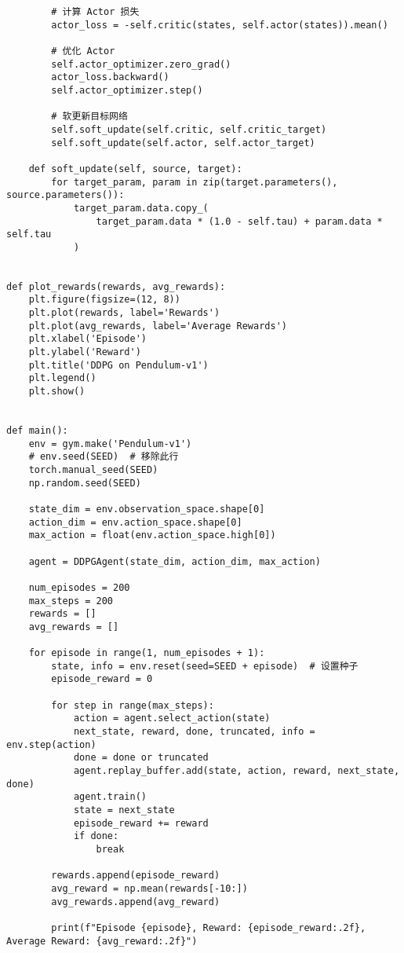 \begin{lstlisting}
        # 计算 Actor 损失
        actor_loss = -self.critic(states, self.actor(states)).mean()

        # 优化 Actor
        self.actor_optimizer.zero_grad()
        actor_loss.backward()
        self.actor_optimizer.step()

        # 软更新目标网络
        self.soft_update(self.critic, self.critic_target)
        self.soft_update(self.actor, self.actor_target)

    def soft_update(self, source, target):
        for target_param, param in zip(target.parameters(), source.parameters()):
            target_param.data.copy_(
                target_param.data * (1.0 - self.tau) + param.data * self.tau
            )


def plot_rewards(rewards, avg_rewards):
    plt.figure(figsize=(12, 8))
    plt.plot(rewards, label='Rewards')
    plt.plot(avg_rewards, label='Average Rewards')
    plt.xlabel('Episode')
    plt.ylabel('Reward')
    plt.title('DDPG on Pendulum-v1')
    plt.legend()
    plt.show()


def main():
    env = gym.make('Pendulum-v1')
    # env.seed(SEED)  # 移除此行
    torch.manual_seed(SEED)
    np.random.seed(SEED)

    state_dim = env.observation_space.shape[0]
    action_dim = env.action_space.shape[0]
    max_action = float(env.action_space.high[0])

    agent = DDPGAgent(state_dim, action_dim, max_action)

    num_episodes = 200
    max_steps = 200
    rewards = []
    avg_rewards = []

    for episode in range(1, num_episodes + 1):
        state, info = env.reset(seed=SEED + episode)  # 设置种子
        episode_reward = 0

        for step in range(max_steps):
            action = agent.select_action(state)
            next_state, reward, done, truncated, info = env.step(action)
            done = done or truncated
            agent.replay_buffer.add(state, action, reward, next_state, done)
            agent.train()
            state = next_state
            episode_reward += reward
            if done:
                break

        rewards.append(episode_reward)
        avg_reward = np.mean(rewards[-10:])
        avg_rewards.append(avg_reward)

        print(f"Episode {episode}, Reward: {episode_reward:.2f}, Average Reward: {avg_reward:.2f}")


\end{lstlisting}

